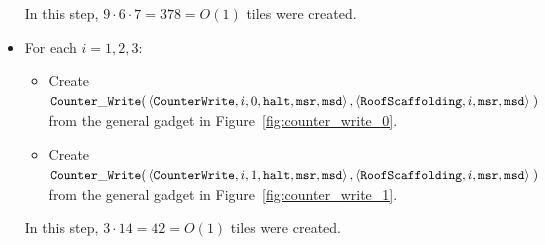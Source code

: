 \begin{itemize}
    In this step, $9 \cdot 6 \cdot 7 = 378 = O(1)$ tiles were created.

    \item For each $i = 1,2,3$:
    \begin{itemize}
        \item Create
        $\begin{aligned}[t]
            {\tt Counter\_Write}(& \left\langle {\tt CounterWrite},    i, 0, {\tt halt}, {\tt msr}, {\tt msd} \right\rangle,
                      \left\langle {\tt RoofScaffolding}, i,                {\tt msr}, {\tt msd} \right\rangle \;)
        \end{aligned}$ \\ from the general gadget in Figure~\ref{fig:counter_write_0}.

        \item Create
        $\begin{aligned}[t]
            {\tt Counter\_Write}(& \left\langle {\tt CounterWrite},    i, 1, {\tt halt}, {\tt msr}, {\tt msd} \right\rangle,
                      \left\langle {\tt RoofScaffolding}, i,                {\tt msr}, {\tt msd} \right\rangle \;)
        \end{aligned}$ \\ from the general gadget in Figure~\ref{fig:counter_write_1}.
    \end{itemize}
    In this step, $3 \cdot 14 = 42 = O(1)$ tiles were created.
\end{itemize}

\vspace{.5cm}

